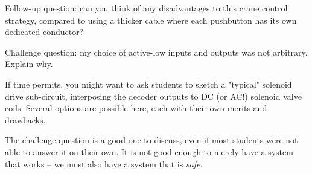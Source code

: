 \vskip 10pt

Follow-up question: can you think of any disadvantages to this crane control strategy, compared to using a thicker cable where each pushbutton has its own dedicated conductor?

\vskip 10pt

Challenge question: my choice of active-low inputs and outputs was not arbitrary.  Explain why.







If time permits, you might want to ask students to sketch a "typical" solenoid drive sub-circuit, interposing the decoder outputs to DC (or AC!) solenoid valve coils.  Several options are possible here, each with their own merits and drawbacks.

The challenge question is a good one to discuss, even if most students were not able to answer it on their own.  It is not good enough to merely have a system that works -- we must also have a system that is {\it safe}.




